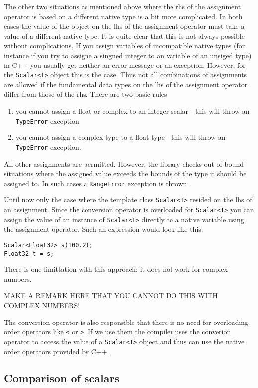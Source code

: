 The other two situations as mentioned above where the rhs of the assignment 
operator is based on a different native type is a bit more complicated. 
In both cases the value of the object on the lhs of the assignment operator 
must take a value of a different native type. It is quite clear that this is 
not always possible without complications. If you assign variables of 
incompatible native types (for instance if you try to assigne a singned integer
to an variable of an unsiged type) in C++ you usually get neither an error
message or an exception. However, for the {\tt Scalar<T>} object this is the 
case. Thus not all combinations of assignments are allowed if the fundamental 
data types on the lhs of the assignment operator differ from those of the 
rhs.
There are two basic rules
\begin{enumerate}
  \item you cannot assign a float or complex to an integer scalar - this will
  throw an {\tt TypeError} exception
  \item you cannot assign a complex type to a float type - this will throw
  an {\tt TypeError} exception.
\end{enumerate}
All other assignments are permitted. However, the library checks out of 
bound situations where the assigned value exceeds the bounds of the 
type it should be assigned to. In such cases a {\tt RangeError} exception 
is thrown. 

Until now only the case where the template class {\tt Scalar<T>} resided on 
the lhs of an assignment. Since the conversion operator is overloaded 
for {\tt Scalar<T>} you can assign the value of an instance of {\tt Scalar<T>}
directly to a native variable using the assignment operator. 
Such an expression would look like this:
\begin{verbatim}
Scalar<Float32> s(100.2);
Float32 t = s;
\end{verbatim}
There is one limittation with this approach: it does not work for 
complex numbers. 
\begin{center}
{\huge MAKE A REMARK HERE THAT YOU CANNOT DO THIS WITH COMPLEX NUMBERS!}
\end{center}
The conversion operator is also responsible that there is 
no need for overloading order operators like {\tt <} or {\tt >}. If 
we use them the compiler uses the converion operator to access the value of 
a {\tt Scalar<T>} object and thus can use the native order operators provided 
by C++.  

\subsection{Comparison of scalars}

